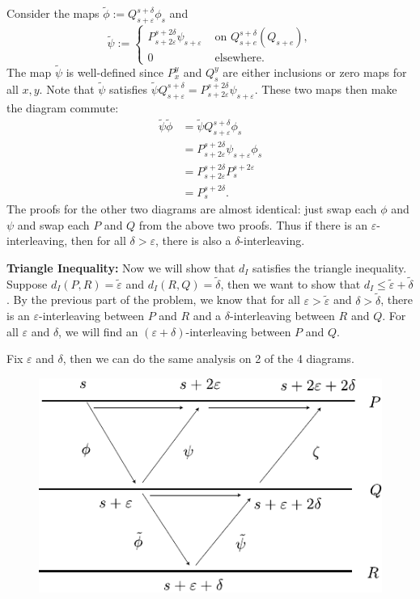 \documentclass[twoside,10pt]{article}
\begin{document}
Consider the maps $\tilde{\phi} := Q_{s+\varepsilon}^{s+\delta}\phi_s$ and
\[
	\tilde{\psi} :=
	\begin{cases}
		P_{s+2\varepsilon}^{s+2\delta} \psi_{s+\varepsilon} & \text{ on } Q_{s+e}^{s+\delta}(Q_{s+e}), \\
		0 & \text{ elsewhere}.
	\end{cases}
\] 
The map $\tilde{\psi}$ is well-defined since $P_{x}^{y}$ and $Q_{s}^{y}$ are either inclusions or zero maps for all $x,y$. Note that $\tilde{\psi}$ satisfies $\tilde{\psi} Q_{s+\varepsilon}^{s+\delta} = P_{s+2\varepsilon}^{s+2\delta}\psi_{s+\varepsilon}$. These two maps then make the diagram commute:
\begin{align*}
	\tilde{\psi} \tilde{\phi} &= \tilde{\psi} Q_{s+\varepsilon}^{s+\delta} \phi_s \\
				  &= P_{s+2\varepsilon}^{s+2\delta} \psi_{s+\varepsilon} \phi_s \\
				  &= P_{s+2\varepsilon}^{s+2\delta} P_{s}^{s+2\varepsilon} \\
				  &= P_{s}^{s+2\delta}.
\end{align*}
The proofs for the other two diagrams are almost identical: just swap each $\phi$ and $\psi$ and swap each $P$ and $Q$ from the above two proofs. Thus if there is an $\varepsilon$-interleaving, then for all $\delta>\varepsilon$, there is also a $\delta$-interleaving.

\textbf{Triangle Inequality:} Now we will show that $d_I$ satisfies the triangle inequality. Suppose $d_I(P,R)=\tilde{\varepsilon}$ and $d_I(R,Q) = \tilde{\delta}$, then we want to show that $d_I \leq \tilde{\varepsilon}+\tilde{\delta}$. By the previous part of the problem, we know that for all $\varepsilon>\tilde{\varepsilon}$ and $\delta>\tilde{\delta}$, there is an $\varepsilon$-interleaving between $P$ and $R$ and a $\delta$-interleaving between $R$ and $Q$. For all $\varepsilon$ and $\delta$, we will find an $(\varepsilon+\delta)$-interleaving between $P$ and $Q$.

Fix $\varepsilon$ and $\delta$, then we can do the same analysis on 2 of the 4 diagrams.

\begin{figure}[H]
	\centering
	\includegraphics[scale=1]{fig/1c.pdf}
\end{figure}
\end{document}
